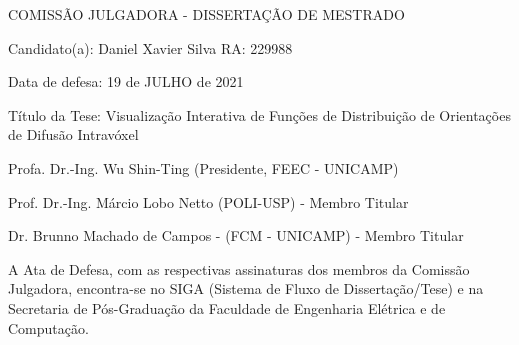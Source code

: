 \documentclass[
    12pt,                %
    oneside,            %
    a4paper,            %
    english,            %
    french,                %
    spanish,            %
    brazil                %
    ]{abntex2}
\begin{document}
    
    
    


% 
%

%
% 
%
\begin{folhadeaprovacao}

  \begin{center}
    COMISS\~{A}O JULGADORA - DISSERTAÇÃO DE MESTRADO
\end{center}
\noindent
\begin{minipage}{\textwidth}\SingleSpacing
Candidato(a): Daniel Xavier Silva     RA: 229988

Data de defesa: 19 de JULHO de 2021

T\'{i}tulo da Tese: Visualização Interativa de Funções de Distribuição de Orientações de Difusão Intravóxel
\vspace{2cm}

Profa. Dr.-Ing. Wu Shin-Ting (Presidente, FEEC - UNICAMP)

Prof. Dr.-Ing. Márcio Lobo Netto (POLI-USP) - Membro Titular

Dr. Brunno Machado de Campos - (FCM - UNICAMP) - Membro Titular


\vspace{2cm}

A Ata de Defesa, com as respectivas assinaturas dos membros da Comissão Julgadora, encontra-se no SIGA (Sistema de Fluxo de Dissertação/Tese) e na Secretaria de Pós-Graduação da Faculdade de Engenharia Elétrica e de Computação.
\end{minipage}

\end{folhadeaprovacao}
\end{document}
